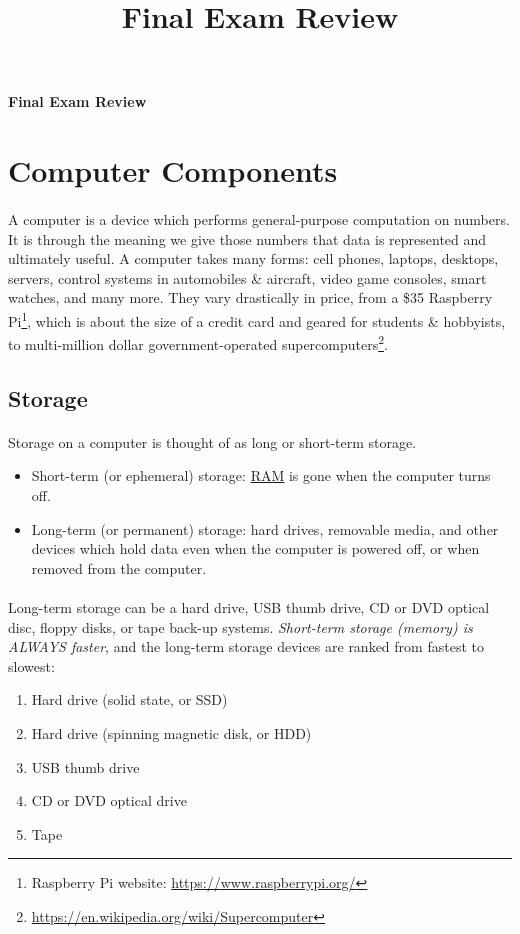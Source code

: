 \documentclass[letter,10pt]{article}
\title{Final Exam Review}
\begin{document}
\huge
\textbf{Final Exam Review}
\normalsize

\tableofcontents

\section{Computer Components}
\paragraph{}A computer is a device which performs general-purpose computation on numbers. It is through the meaning we give those numbers that data is represented and ultimately useful. A computer takes many forms: cell phones, laptops, desktops, servers, control systems in automobiles \& aircraft, video game consoles, smart watches, and many more. They vary drastically in price, from a \$35 Raspberry Pi\footnote{Raspberry Pi website: \url{https://www.raspberrypi.org/}}, which is about the size of a credit card and geared for students \& hobbyists, to multi-million dollar government-operated supercomputers\footnote{\url{https://en.wikipedia.org/wiki/Supercomputer}}.

\subsection{Storage}
\paragraph{}Storage on a computer is thought of as long or short-term storage.
\begin{itemize}
    \item Short-term (or ephemeral) storage: \hyperref[sec:ram]{RAM} is gone when the computer turns off.
    \item Long-term (or permanent) storage: hard drives, removable media, and other devices which hold data even when the computer is powered off, or when removed from the computer.
\end{itemize}

\paragraph{}Long-term storage can be a hard drive, USB thumb drive, CD or DVD optical disc, floppy disks, or tape back-up systems. \textit{Short-term storage (memory) is ALWAYS faster}, and the long-term storage devices are ranked from fastest to slowest:
\begin{enumerate}
    \item Hard drive (solid state, or SSD)
    \item Hard drive (spinning magnetic disk, or HDD)
    \item USB thumb drive
    \item CD or DVD optical drive
    \item Tape
\end{enumerate}
\end{document}
